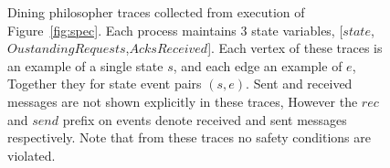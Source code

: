\begin{figure}
\begin{minipage}{.3\textwidth}
 \end{minipage}
    \caption{Dining philosopher traces collected from execution of
    Figure~\ref{fig:spec}. Each process maintains 3 state variables,
    [$state$,$OustandingRequests$,$AcksReceived$]. Each vertex of these traces
    is an example of a single state $s$, and each edge an example of $e$,
    Together they for state event pairs $(s,e)$. Sent and received messages are
    not shown explicitly in these traces, However the $rec$ and $send$ prefix on
    events denote received and sent messages respectively. Note that from these
    traces no safety conditions are violated.}
    \label{fig:trace} \end{figure}


